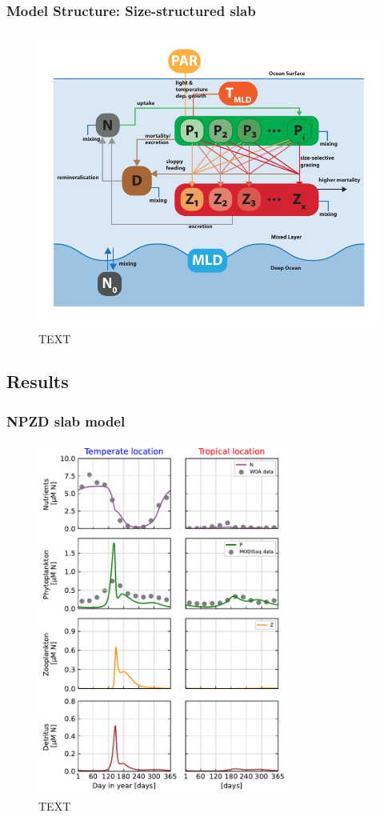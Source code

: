 \documentclass[journal abbreviation, manuscript]{copernicus}
\begin{document}
\subsubsection{Model Structure: Size-structured slab}
\begin{figure}[t]
\includegraphics[width=12cm]{Figures/firstdraft_schematics/03__schematics_SizeStructSlab.pdf}
\caption{TEXT}
\label{phydraschematics_3}
\end{figure}


\subsection{Results}

\subsubsection{NPZD slab model}

\begin{figure}[t]
\includegraphics[width=8.3cm]{Figures/firstdraft_plots/02_NPZDslab.pdf}
\caption{TEXT}
\end{figure}
\end{document}
